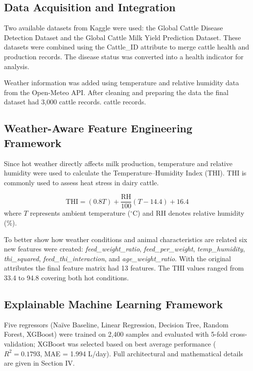 \documentclass[conference]{IEEEtran}
\begin{document}
	\subsection{Data Acquisition and Integration}
	Two available datasets from Kaggle were used: the Global Cattle Disease Detection Dataset and the Global Cattle Milk Yield Prediction Dataset. These datasets were combined using the Cattle\_ID attribute to merge cattle health and production records. The disease status was converted into a health indicator for analysis.
	
	Weather information was added using temperature and relative humidity data from the Open-Meteo API. After cleaning and preparing the data the final dataset had 3,000 cattle records. cattle records.
	
	\subsection{Weather-Aware Feature Engineering Framework}
	Since hot weather directly affects milk production, temperature and relative humidity were used to calculate the Temperature–Humidity Index (THI). THI is commonly used to assess heat stress in dairy cattle.
	
	\begin{equation}
		\text{THI} = (0.8T) + \frac{\text{RH}}{100}(T - 14.4) + 16.4
	\end{equation}
	where $T$ represents ambient temperature ($^\circ$C) and $\text{RH}$ denotes relative humidity (\%).
	
	To better show how weather conditions and animal characteristics are related six new features were created: \textit{feed\_weight\_ratio}, \textit{feed\_per\_weight}, \textit{temp\_humidity}, \textit{thi\_squared}, \textit{feed\_thi\_interaction}, and \textit{age\_weight\_ratio}. With the original attributes the final feature matrix had 13 features. The THI values ranged from 33.4 to 94.8 covering both hot conditions. 
	
	\subsection{Explainable Machine Learning Framework}
	Five regressors (Naïve Baseline, Linear Regression, Decision Tree, Random Forest, XGBoost) were trained on 2,400 samples and evaluated with 5-fold cross-validation; XGBoost was selected based on best average performance ($R^2 = 0.1793$, MAE = 1.994 L/day). Full architectural and mathematical details are given in Section IV.
	
\end{document}
